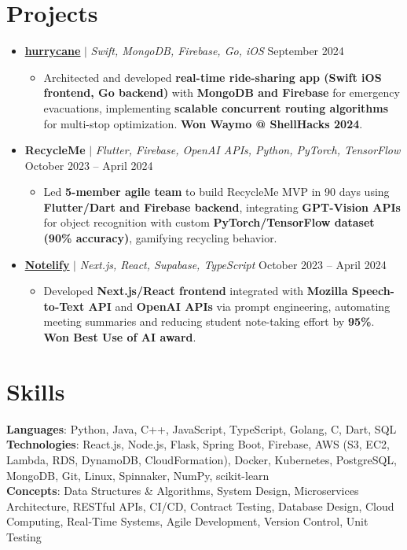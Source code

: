 \documentclass[letterpaper,11pt]{article}
\newcommand{\resumeItem}[1]{
  \item\small{
    {#1 \vspace{-2pt}}
  }
}
\newcommand{\resumeProjectHeading}[2]{
  \item
  \small#1 \hfill #2 \\
  \vspace{-7pt} %
}
\newcommand{\resumeSubHeadingListStart}{\begin{itemize}[leftmargin=0.15in, label={}]}
\newcommand{\resumeSubHeadingListEnd}{\end{itemize}}
\newcommand{\resumeItemListStart}{\begin{itemize}}
\newcommand{\resumeItemListEnd}{\end{itemize}\vspace{-5pt}}
\begin{document}
\section{Projects}
    \resumeSubHeadingListStart
      \resumeProjectHeading
          {\underline{\textbf {\href{https://github.com/keshavbabu/shellhacks/tree/main}{hurrycane}}} $|$ \emph{Swift, MongoDB, Firebase, Go, iOS}}{September 2024}
          \resumeItemListStart
            \resumeItem{Architected and developed \textbf{real-time ride-sharing app (Swift iOS frontend, Go backend)} with \textbf{MongoDB and Firebase} for emergency evacuations, implementing \textbf{scalable concurrent routing algorithms} for multi-stop optimization. \textbf{Won Waymo @ ShellHacks 2024}.}
          \resumeItemListEnd
      \resumeProjectHeading
          {\textbf{RecycleMe} $|$ \emph{Flutter, Firebase, OpenAI APIs, Python, PyTorch, TensorFlow}}{October 2023 -- April 2024}
          \resumeItemListStart
            \resumeItem{Led \textbf{5-member agile team} to build RecycleMe MVP in 90 days using \textbf{Flutter/Dart and Firebase backend}, integrating \textbf{GPT-Vision APIs} for object recognition with custom \textbf{PyTorch/TensorFlow dataset (90\% accuracy)}, gamifying recycling behavior.}
          \resumeItemListEnd
      \resumeProjectHeading
          {\underline{\textbf {\href{https://www.notelify.co/}{Notelify}}} $|$ \emph{Next.js, React, Supabase, TypeScript}}{October 2023 -- April 2024}
          \resumeItemListStart
            \resumeItem{Developed \textbf{Next.js/React frontend} integrated with \textbf{Mozilla Speech-to-Text API} and \textbf{OpenAI APIs} via prompt engineering, automating meeting summaries and reducing student note-taking effort by \textbf{95\%}. \textbf{Won Best Use of AI award}.}
          \resumeItemListEnd
    \resumeSubHeadingListEnd

\section{Skills}
 \begin{itemize}[leftmargin=0.15in, label={}]
    \small{\item{
     \textbf{Languages}{: Python, Java, C++, JavaScript, TypeScript, Golang, C, Dart, SQL} \\
     \textbf{Technologies}{: React.js, Node.js, Flask, Spring Boot, Firebase, AWS (S3, EC2, Lambda, RDS, DynamoDB, CloudFormation), Docker, Kubernetes, PostgreSQL, MongoDB, Git, Linux, Spinnaker, NumPy, scikit-learn} \\
     \textbf{Concepts}{: Data Structures \& Algorithms, System Design, Microservices Architecture, RESTful APIs, CI/CD, Contract Testing, Database Design, Cloud Computing, Real-Time Systems, Agile Development, Version Control, Unit Testing} }}
 \end{itemize}

%
\end{document}
